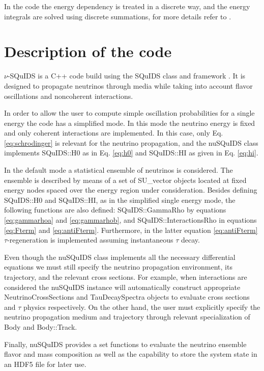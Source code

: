 \documentclass[3p,12pt]{elsarticle}
\newcommand{\ttf}{\ttfamily}
\begin{document}
In the code the energy dependency is treated in a discrete way, and
the energy integrals are solved using discrete summations, for more
details refer to \citep{SQUIDS}.

\section{Description of the code} 
\label{sec:code} 

$\nu$-SQuIDS is a {\ttf C++} code build using the SQuIDS class and
framework \citep{SQUIDS}. It is designed to propagate neutrinos
through media while taking into account flavor oscillations and
noncoherent interactions. 

In order to allow the user to compute simple oscillation probabilities
for a single energy the code has a simplified mode.
In this mode the neutrino energy is fixed and only coherent interactions
are implemented.
In this case, only Eq. \eqref{eq:schrodinger} is relevant for the
neutrino propagation, and the {\ttf nuSQuIDS} class implements {\ttf
  SQuIDS::H0} as in Eq. \eqref{eq:h0} and {\ttf SQuIDS::HI} as given
in Eq. \eqref{eq:hi}. 

In the default mode a statistical ensemble of neutrinos is
considered. The ensemble is described by means of a set of {\ttf
  SU\_vector} objects located at fixed  energy nodes spaced over the
energy region under consideration. Besides defining {\ttf SQuIDS::H0}
and {\ttf SQuIDS::HI}, as in the simplified single energy mode, the
following functions are also defined: {\ttf SQuIDS::GammaRho} by
equations \eqref{eq:gammarhoa} and \eqref{eq:gammarhob}, and {\ttf
  SQuIDS::InteractionsRho} in equations \eqref{eq:Fterm} and
\eqref{eq:antiFterm}. Furthermore, in the latter equation
\eqref{eq:antiFterm} $\tau$-regeneration is implemented assuming
instantaneous $\tau$ decay.

Even though the {\ttf nuSQuIDS} class implements all the necessary
differential equations we must still specify the neutrino propagation
environment, its trajectory, and the relevant cross sections.  For
example, when interactions are considered the {\ttf nuSQuIDS} instance
will automatically construct appropriate {\ttf NeutrinoCrossSections}
and {\ttf TauDecaySpectra} objects to evaluate cross sections and
$\tau$ physics respectively. On the other hand, the user must
explicitly specify the neutrino propagation medium and trajectory
through relevant specialization of {\ttf Body} and {\ttf Body::Track}.

Finally, {\ttf nuSQuIDS} provides a set functions to evaluate the
neutrino ensemble flavor and mass composition as well as the
capability to store the system state in an HDF5 \citep{folk1999hdf5}
file for later use.
\end{document}
